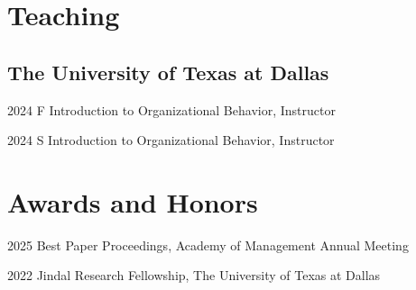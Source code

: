 \documentclass[12pt,letterpaper]{report} %
\begin{document}








    \section*{Teaching}

    \subsection*{The University of Texas at Dallas}

    \begin{tablist}

        \item[2024 F]\tab{}Introduction to Organizational Behavior, Instructor
        \item[2024 S]\tab{}Introduction to Organizational Behavior, Instructor
        
    \end{tablist}


    \section*{Awards and Honors} %


    \begin{tablist}

        \item[2025]\tab{}Best Paper Proceedings, Academy of Management Annual Meeting
        \item[2022]\tab{}Jindal Research Fellowship, The University of Texas at Dallas

    \end{tablist}
\end{document}
